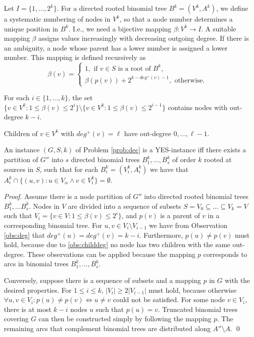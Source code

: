 Let $I=\{1,\dots,2^k\}$.
For a directed rooted binomial tree $B^k=(V^k,A^k)$, we define a systematic numbering of nodes in $V^k$, so that a node number determines a unique position in $B^k$.
I.e., we need a bijective mapping $\beta: V^k \to I$.
A suitable mapping $\beta$ assigns values increasingly with decreasing outgoing degree. 
If there is an ambiguity, a node whose parent has a lower number is assigned a lower number.
This mapping is defined recursively as
\begin{equation}
\label{eq:beta}
\beta(v)=\begin{cases}
1,\text{ if } v\in S \text{ is a root of } B^k,\\
\beta(p(v)) + 2^{k-deg^+(v)-1}, \text{ otherwise}.
\end{cases}
\end{equation}
\begin{observation}\label{obs:deg}
For each $i\in\{1,\dots,k\}$, the set $\{v\in V^k: 1\leq\beta(v)\leq2^i\}\setminus\{v\in V^k:1\leq\beta(v)\leq2^{i-1}\}$ contains nodes with out-degree $k-i$.
\end{observation}
\begin{observation}\label{obs:childdeg}
Children of $v\in V^k$ with $deg^+(v)=\ell$ have out-degree $0,\dots,\ell-1$.
\end{observation}
\begin{proposition}\label{lem:probeq}
An instance $(G,S,k)$ of Problem \ref{prob:dec} is a YES-instance iff 
there exists a partition of $G''$ into $s$ directed binomial trees $B^k_1,\dots,B^k_{s}$ of order $k$ rooted at sources in $S$,
such that for each $B^k_i=(V^k_i,A^k_i)$ we have that $A^k_i\cap\{(u,v):u \in V_\alpha \wedge v\in V^k_i\}=\emptyset$. 
\end{proposition}
\begin{proof}
Assume there is a node partition of $G''$ into directed rooted binomial trees $B^k_1,\dots B^k_{s}$. 
Nodes in $V$ are divided into a sequence of subsets $S=V_0\subseteq\dots\subseteq V_k=V$ such that $V_i=\{v\in V:1\leq\beta(v)\leq 2^i\}$,
and $p(v)$ is a parent of $v$ in a corresponding binomial tree.
For $u,v\in V_i\setminus V_{i-1}$ we have from Observation \ref{obs:deg} that $deg^+(u)=deg^+(v)=k-i$.
Furthermore, $p(u)\neq p(v)$ must hold, because due to \ref{obs:childdeg} no node has two children with the same out-degree.
These observations can be applied because the mapping $p$ corresponds to arcs in binomial trees $B^k_1,\dots,B^k_{s}$. 

Conversely, suppose there is a sequence of subsets and a mapping $p$ in $G$ with the desired properties.
For $1\leq i\leq k$, $|V_i|\geq2|V_{i-1}|$ must hold, because otherwise $\forall u,v\in V_i:p(u)\neq p(v)\Leftrightarrow u\neq v$ could not be satisfied.
For some node $v\in V_i$, there is at most $k-i$ nodes $u$ such that $p(u)=v$.
Truncated binomial trees covering $G$ can then be constructed simply by following the mapping $p$.
The remaining arcs that complement binomial trees are distributed along $A''\setminus A$.
\qed
\end{proof}

